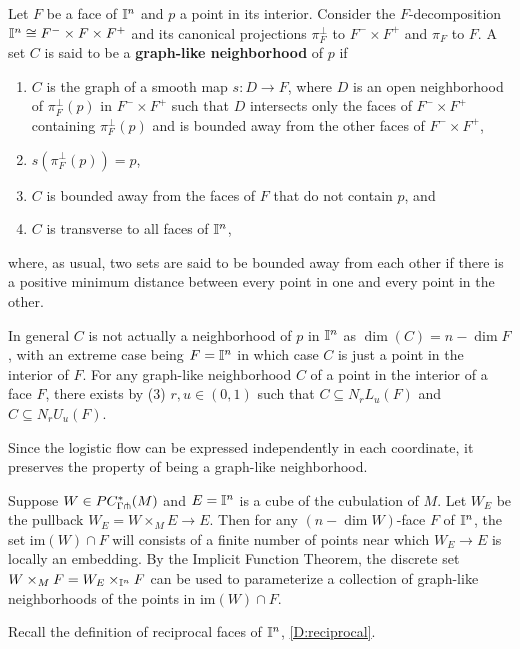 \begin{definition}\label{D:graph-like}
	Let $F$ be a face of $\mathbb{I}^n$ and $p$ a point in its interior.
	Consider the $F$-decomposition $\mathbb{I}^n \cong F^- \times F \times F^+$ and its canonical projections $\pi_F^{\perp}$ to $F^- \times F^+$ and $\pi_F$ to $F$.
	A set $C$ is said to be a \textbf{graph-like neighborhood} of $p$ if
	\begin{enumerate}
		\item $C$ is the graph of a smooth map $s \colon D \to F$, where $D$ is an open neighborhood of $\pi_F^\perp(p)$ in $F^- \times F^+$ such that $D$ intersects only the faces of $F^- \times F^+$ containing $\pi_F^\perp(p)$ and is bounded away from the other faces of $F^- \times F^+$,
		\item $s(\pi_F^\perp(p)) = p$,
		\item $C$ is bounded away from the faces of $F$ that do not contain $p$, and
		\item $C$ is transverse to all faces of $\mathbb{I}^n$,
	\end{enumerate}
	where, as usual, two sets are said to be bounded away from each other if there is a positive minimum distance between every point in one and every point in the other.
\end{definition}

In general $C$ is not actually a neighborhood of $p$ in $\mathbb{I}^n$ as $\dim(C)=n-\dim F$, with an extreme case being $F =\mathbb{I}^n$ in which case $C$ is just a point in the interior of $F$.
For any graph-like neighborhood $C$ of a point in the interior of a face $F$, there exists by (3) $r, u \in (0,1)$ such that $C \subseteq N_rL_u(F)$ and $C \subseteq N_rU_u(F)$.

Since the logistic flow can be expressed independently in each coordinate, it preserves the property of being a graph-like neighborhood.

Suppose $W \in PC^*_{\Gamma \pitchfork}(M)$ and $E = \mathbb{I}^n$ is a cube of the cubulation of $M$.
Let $W_E$ be the pullback $W_E = W \times_M E \to E$.
Then for any $(n-\dim W)$-face $F$ of $\mathbb{I}^n$, the set im$(W) \cap F$ will consists of a finite number of points near which $W_E \to E$ is locally an embedding.
By the Implicit Function Theorem, the discrete set $W \times_{M} F = W_E \times_{\mathbb{I}^n} F$ can be used to parameterize a collection of graph-like neighborhoods of the points in im$(W) \cap F$.


Recall the definition of reciprocal faces of $\mathbb{I}^n$, \cref{D:reciprocal}.


